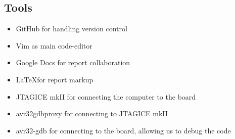 
\subsection{Tools}


\begin{itemize}
\item GitHub for handling version control
\item Vim as main code-editor
\item Google Docs for report collaboration
\item \LaTeX for report markup
\item JTAGICE mkII for connecting the computer to the board
\item avr32gdbproxy for connecting to JTAGICE mkII
\item avr32-gdb for connecting to the board, allowing us to debug the code
\end{itemize}

